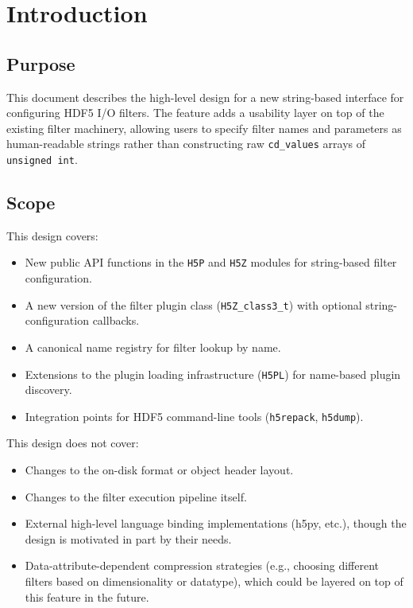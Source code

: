 \documentclass[../HDF5_RFC.tex]{subfiles}
\begin{document}
\section{Introduction}
\label{sec:intro}

\subsection{Purpose}

This document describes the high-level design for a new string-based interface
for configuring HDF5 I/O filters. The feature adds a usability layer on top of
the existing filter machinery, allowing users to specify filter names and
parameters as human-readable strings rather than constructing raw \texttt{cd\_values}
arrays of \texttt{unsigned int}.

\subsection{Scope}

This design covers:

\begin{itemize}
\item New public API functions in the \texttt{H5P} and \texttt{H5Z} modules for string-based
  filter configuration.
\item A new version of the filter plugin class (\texttt{H5Z\_class3\_t}) with optional
  string-configuration callbacks.
\item A canonical name registry for filter lookup by name.
\item Extensions to the plugin loading infrastructure (\texttt{H5PL}) for name-based
  plugin discovery.
\item Integration points for HDF5 command-line tools (\texttt{h5repack}, \texttt{h5dump}).
\end{itemize}

This design does not cover:

\begin{itemize}
\item Changes to the on-disk format or object header layout.
\item Changes to the filter execution pipeline itself.
\item External high-level language binding implementations (h5py, etc.), though
  the design is motivated in part by their needs.
\item Data-attribute-dependent compression strategies (e.g., choosing different
  filters based on dimensionality or datatype), which could be layered on top
  of this feature in the future.
\end{itemize}
\end{document}
